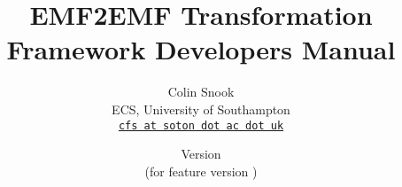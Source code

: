 \documentclass[a4paper,10pt]{article}
\title{EMF2EMF Transformation Framework Developers Manual}
\author{%
  Colin Snook\\%
  ECS, University of Southampton\\%
  \texttt{\href{mailto:cfs@soton.ac.uk}{cfs at soton dot ac dot uk}}%
}%
\date{%
  Version \EMFEMFManualVersion\\%
  (for feature version \EMFEMFFeatureVersion)\\
  \ifplastex
  \EMFEMFManualDate
  \else
  \displaydate{EMFEMFManualDate}%
  \fi
}
\begin{document}
\ifplastex%
\maketitle%
\else%
 \ifstandalone%
 \maketitle %
 \else%
 \fi%
\fi%











%


\end{document}
